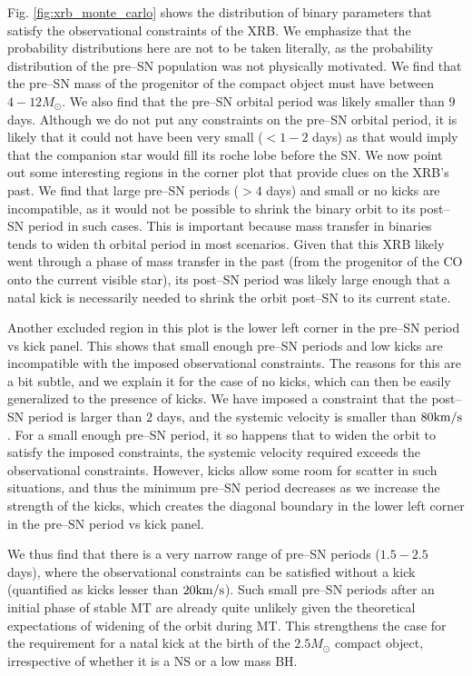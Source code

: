 \documentclass[linenumbers,trackchanges,twocolumn]{aastex701}
\begin{document}
Fig. \ref{fig:xrb_monte_carlo} shows the distribution of binary parameters that satisfy the observational constraints of the XRB. We emphasize that the probability distributions here are not to be taken literally, as the probability distribution of the pre--SN population was not physically motivated. We find that the pre--SN mass of the progenitor of the compact object must have between $4-12M_{\odot}$. We also find that the pre--SN orbital period was likely smaller than $9$ days. Although we do not put any constraints on the pre--SN orbital period, it is likely that it could not have been very small ($<1-2$ days) as that would imply that the companion star would fill its roche lobe before the SN. We now point out some interesting regions in the corner plot that provide clues on the XRB's past. We find that large pre--SN periods ($>4$ days) and small or no kicks are incompatible, as it would not be possible to shrink the binary orbit to its post--SN period in such cases. This is important because mass transfer in binaries tends to widen th orbital period in most scenarios. Given that this XRB likely went through a phase of mass transfer in the past (from the progenitor of the CO onto the current visible star), its post--SN period was likely large enough that a natal kick is necessarily needed to shrink the orbit post--SN to its current state.

Another excluded region in this plot is the lower left corner in the pre--SN period vs kick panel. This shows that small enough pre--SN periods and low kicks are incompatible with the imposed observational constraints. The reasons for this are a bit subtle, and we explain it for the case of no kicks, which can then be easily generalized to the presence of kicks. We have imposed a constraint that the post--SN period is larger than $2$ days, and the systemic velocity is smaller than $80\rm km/s$. For a small enough pre--SN period, it so happens that to widen the orbit to satisfy the imposed constraints, the systemic velocity required exceeds the observational constraints. However, kicks allow some room for scatter in such situations, and thus the minimum pre--SN period decreases as we increase the strength of the kicks, which creates the diagonal boundary in the lower left corner in the pre--SN period vs kick panel.

We thus find that there is a very narrow range of pre--SN periods ($1.5-2.5$ days), where the observational constraints can be satisfied without a kick (quantified as kicks lesser than $20 \rm km/s$). Such small pre--SN periods after an initial phase of stable MT are already quite unlikely given the theoretical expectations of widening of the orbit during MT. This strengthens the case for the requirement for a natal kick at the birth of the $2.5 M_{\odot}$ compact object, irrespective of whether it is a NS or a low mass BH.
\end{document}
